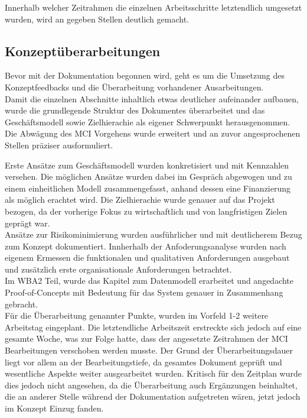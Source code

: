 Innerhalb welcher Zeitrahmen die einzelnen Arbeitsschritte letztendlich umgesetzt wurden, wird an gegeben Stellen deutlich gemacht.\\

\subsection{Konzeptüberarbeitungen}
Bevor mit der Dokumentation begonnen wird, geht es um die Umsetzung des Konzeptfeedbacks und die Überarbeitung vorhandener Ausarbeitungen.\\
Damit die einzelnen Abschnitte inhaltlich etwas deutlicher aufeinander aufbauen, wurde die grundlegende Struktur des Dokumentes überarbeitet und das Geschäftsmodell sowie Zielhierachie als eigener Schwerpunkt herausgenommen. Die Abwägung des MCI Vorgehens wurde erweitert und an zuvor angesprochenen Stellen präziser ausformuliert.

Erste Ansätze zum Geschäftsmodell wurden konkretisiert und mit Kennzahlen versehen. Die möglichen Ansätze wurden dabei im Gespräch abgewogen und zu einem einheitlichen Modell zusammengefasst, anhand dessen eine Finanzierung als möglich erachtet wird. Die Zielhierachie wurde genauer auf das Projekt bezogen, da der vorherige Fokus zu wirtschaftlich und von langfristigen Zielen geprägt war.\\
Ansätze zur Risikominimierung wurden ausführlicher und mit deutlicherem Bezug zum Konzept dokumentiert. Innherhalb der Anfoderungsanalyse wurden nach eigenem Ermessen die funktionalen und qualitativen Anforderungen ausgebaut und zusätzlich erste organisationale Anforderungen betrachtet.\\
Im WBA2 Teil, wurde das Kapitel zum Datenmodell erarbeitet und angedachte Proof-of-Concepts mit Bedeutung für das System genauer in Zusammenhang gebracht.\\

Für die Überarbeitung genannter Punkte, wurden im Vorfeld 1-2 weitere Arbeitstag eingeplant. Die letztendliche Arbeitszeit erstreckte sich jedoch auf eine gesamte Woche, was zur Folge hatte, dass der angesetzte Zeitrahmen der MCI Bearbeitungen verschoben werden musste. Der Grund der Überarbeitungsdauer liegt vor allem an der Bearbeitungstiefe, da gesamtes Dokument geprüft und wesentliche Aspekte weiter ausgearbeitet wurden. Kritisch für den Zeitplan wurde dies jedoch nicht angesehen, da die Überarbeitung auch Ergänzungen beinhaltet, die an anderer Stelle während der Dokumentation aufgetreten wären, jetzt jedoch im Konzept Einzug fanden. 

